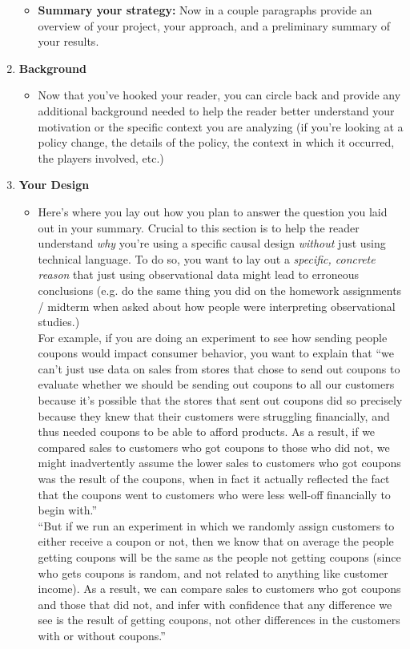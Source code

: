 \documentclass[12pt]{article}
\begin{document}
\begin{enumerate}
\begin{itemize}
        \item \textbf{Summary your strategy:} Now in a couple paragraphs provide an overview of your project, your approach, and a preliminary summary of your results.
    \end{itemize}
    \item \textbf{Background}
    \begin{itemize}
        \item Now that you've hooked your reader, you can circle back and provide any additional background needed to help the reader better understand your motivation or the specific context you are analyzing (if you're looking at a policy change, the details of the policy, the context in which it occurred, the players involved, etc.)
    \end{itemize}
    \item \textbf{Your Design}
    \begin{itemize}
        \item Here's where you lay out how you plan to answer the question you laid out in your summary. Crucial to this section is to help the reader understand \emph{why} you're using a specific causal design \emph{without} just using technical language. To do so, you want to lay out a \emph{specific, concrete reason} that just using observational data might lead to erroneous conclusions (e.g. do the same thing you did on the homework assignments / midterm when asked about how people were interpreting observational studies.)\\
        For example, if you are doing an experiment to see how sending people coupons would impact consumer behavior, you want to explain that ``we can't just use data on sales from stores that chose to send out coupons to evaluate whether we should be sending out coupons to all our customers because it's possible that the stores that sent out coupons did so precisely because they knew that their customers were struggling financially, and thus needed coupons to be able to afford products. As a result, if we compared sales to customers who got coupons to those who did not, we might inadvertently assume the lower sales to customers who got coupons was the result of the coupons, when in fact it actually reflected the fact that the coupons went to customers who were less well-off financially to begin with.'' \\
        ``But if we run an experiment in which we randomly assign customers to either receive a coupon or not, then we know that on average the people getting coupons will be the same as the people not getting coupons (since who gets coupons is random, and not related to anything like customer income). As a result, we can compare sales to customers who got coupons and those that did not, and infer with confidence that any difference we see is the result of getting coupons, not other differences in the customers with or without coupons.'' \\

\end{itemize}
\end{enumerate}
\end{document}

